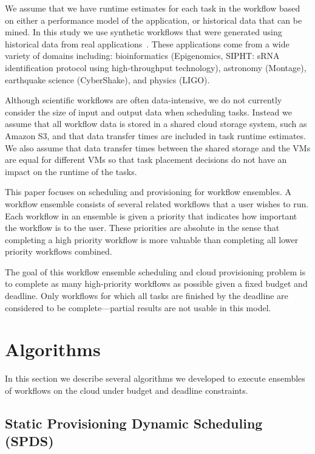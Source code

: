 \documentclass{sig-alternate}
\begin{document}
We assume that we have runtime estimates for each task in the workflow based on
either a performance model of the application, or historical data that can be
mined. In this study we use synthetic workflows that were generated using 
historical data from real applications~\cite{Bharathi08}. These applications 
come from a wide variety of domains including: bioinformatics (Epigenomics, 
SIPHT: sRNA identification protocol using high-throughput
technology), astronomy (Montage), earthquake science (CyberShake), and physics 
(LIGO).


Although scientific workflows are often data-intensive, we do not currently
consider the size of input and output data when scheduling tasks. Instead we
assume that all workflow data is stored in a shared cloud storage system, such
as Amazon S3, and that data transfer times are included in task runtime
estimates. We also assume that data transfer times between the shared storage
and the VMs are equal for different VMs so that task placement decisions do not
have an impact on the runtime of the tasks.


This paper focuses on scheduling and provisioning for workflow ensembles. A
workflow ensemble consists of several related workflows that a user wishes to
run. Each workflow in an ensemble is given a priority that indicates how
important the workflow is to the user. These priorities are absolute in the 
sense that completing a high priority workflow is more valuable than 
completing all lower priority workflows combined.


The goal of this workflow ensemble scheduling and cloud provisioning problem is
to complete as many high-priority workflows as possible given a fixed budget and
deadline. Only workflows for which all tasks are finished by the deadline are 
considered to be complete---partial results are not usable in this model.


\section{Algorithms}
\label{sec:algorithms}

In this section we describe several algorithms we developed to execute ensembles of
workflows on the cloud under budget and deadline constraints.

\subsection{Static Provisioning Dynamic Scheduling \\
(SPDS) }
\label{sec:spds}
\end{document}
